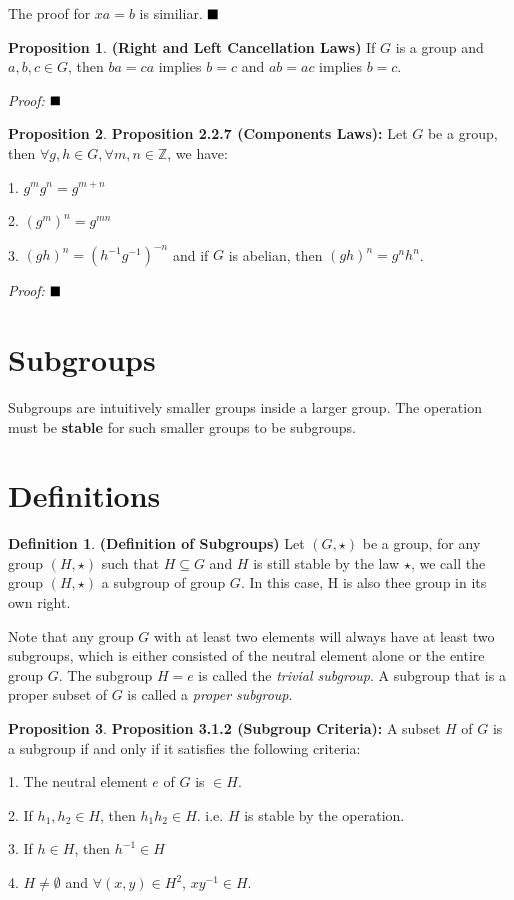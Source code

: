 \documentclass{article}
\theoremstyle{definition}
\newtheorem{defi}{Definition}[subsection]
\newtheorem{prop}{Proposition}[subsection]
\begin{document}
The proof for $xa=b$ is similiar. $\hfill\blacksquare$

\begin{prop}
\noindent\textbf{(Right and Left Cancellation Laws)} If $G$ is a group and $a,b,c \in G$, then $ba=ca$ implies $b=c$ and $ab=ac$ implies $b=c$.
\end{prop}

\textit{Proof:} $\hfill\blacksquare$

\begin{prop}
\noindent\textbf{Proposition 2.2.7 (Components Laws):} Let $G$ be a group, then $\forall g,h \in G, \forall m,n \in \mathbb{Z}$, we have:

1. $g^{m}g^{n}=g^{m+n}$

2. $(g^{m})^{n} = g^{mn}$

3. $ (gh)^{n} = (h^{-1}g^{-1})^{-n} $ and if $G$ is abelian, then $(gh)^{n} = g^nh^n$.
\end{prop}

\textit{Proof:} $\hfill\blacksquare$

\noindent\textbf{}

\section{Subgroups}

Subgroups are intuitively smaller groups inside a larger group. The operation must be \textbf{stable} for such smaller groups to be subgroups.

\section{Definitions}

\begin{defi}
\noindent\textbf{(Definition of Subgroups)} Let $(G, \star)$ be a group, for any group $(H, \star)$ such that $H \subseteq G$ and $H$ is still stable by the law $\star$, we call the group $(H, \star)$ a subgroup of group $G$. In this case, H is also thee group in its own right.

\end{defi}
Note that any group $G$ with at least two elements will always have at least two subgroups, which is either consisted of the neutral element alone or the entire group $G$. The subgroup $H={e}$ is called the \textit{trivial subgroup}. A subgroup that is a proper subset of $G$ is called a \textit{proper subgroup}.

\begin{prop}
\noindent\textbf{Proposition 3.1.2 (Subgroup Criteria):} A subset $H$ of $G$ is a subgroup if and only if it satisfies the following criteria:

1. The neutral element $e$ of $G$ is $\in H$.

2. If $h_1, h_2 \in H$, then $h_1h_2 \in H$. i.e. $H$ is stable by the operation.

3. If $h \in H$, then $h^{-1} \in H$

4. $H \neq \emptyset$ and $\forall(x,y)\in H^{2}$, $xy^{-1} \in H$.
\end{prop}
\end{document}
